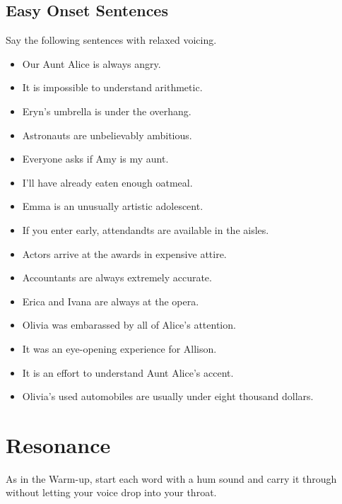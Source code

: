 \documentclass{article}
\begin{document}
\subsection*{Easy Onset Sentences}
Say the following sentences with relaxed voicing.
\begin{itemize}
    \item Our Aunt Alice is always angry.
    \item It is impossible to understand arithmetic.
    \item Eryn's umbrella is under the overhang.
    \item Astronauts are unbelievably ambitious.
    \item Everyone asks if Amy is my aunt.
    \item I'll have already eaten enough oatmeal.
    \item Emma is an unusually artistic adolescent.
    \item If you enter early, attendandts are available in the aisles.
    \item Actors arrive at the awards in expensive attire.
    \item Accountants are always extremely accurate.
    \item Erica and Ivana are always at the opera.
    \item Olivia was embarassed by all of Alice's attention.
    \item It was an eye-opening experience for Allison.
    \item It is an effort to understand Aunt Alice's accent.
    \item Olivia's used automobiles are usually under eight thousand dollars.
\end{itemize}

\pagebreak
\section*{Resonance}
As in the Warm-up, start each word with a hum sound and carry it through without letting your voice drop into your throat.
\end{document}
